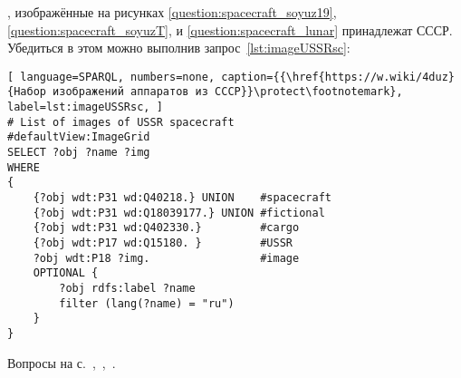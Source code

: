 \begin{task}
    \label{answer:spacecraft_USSR}
    , изображённые на рисунках \ref{question:spacecraft_soyuz19}, \ref{question:spacecraft_soyuzT}, и \ref{question:spacecraft_lunar} принадлежат СССР. Убедиться в этом можно выполнив запрос~\ref{lst:imageUSSRsc}:
    \begin{lstlisting}[ language=SPARQL, numbers=none, caption={{\href{https://w.wiki/4duz}{Набор изображений аппаратов из СССР}}\protect\footnotemark}, label=lst:imageUSSRsc, ]
# List of images of USSR spacecraft
#defaultView:ImageGrid
SELECT ?obj ?name ?img
WHERE
{
    {?obj wdt:P31 wd:Q40218.} UNION    #spacecraft
    {?obj wdt:P31 wd:Q18039177.} UNION #fictional 
    {?obj wdt:P31 wd:Q402330.}         #cargo 
    {?obj wdt:P17 wd:Q15180. }         #USSR
    ?obj wdt:P18 ?img.                 #image
    OPTIONAL {
		?obj rdfs:label ?name 
		filter (lang(?name) = "ru")
	}
}    \end{lstlisting}

    \small{Вопросы на с.~\pageref{question:spacecraft_soyuz19},~\pageref{question:spacecraft_soyuzT},~\pageref{question:spacecraft_lunar}.}
\end{task}

